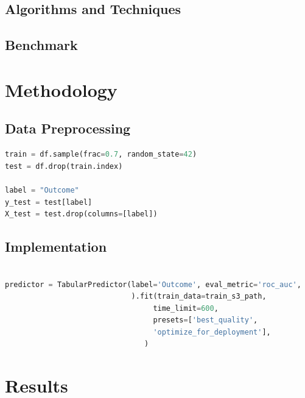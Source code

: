 \documentclass[
]{article}
\begin{document}
\hypertarget{algorithms-and-techniques}{%
\subsection{Algorithms and Techniques}\label{algorithms-and-techniques}}

\hypertarget{benchmark}{%
\subsection{Benchmark}\label{benchmark}}

\hypertarget{methodology}{%
\section{Methodology}\label{methodology}}

\hypertarget{data-preprocessing}{%
\subsection{Data Preprocessing}\label{data-preprocessing}}

\begin{lstlisting}[language=python]
train = df.sample(frac=0.7, random_state=42)
test = df.drop(train.index)

label = "Outcome"
y_test = test[label]
X_test = test.drop(columns=[label])

\end{lstlisting}

\hypertarget{implementation}{%
\subsection{Implementation}\label{implementation}}

\begin{lstlisting}[language=python]
%%time

predictor = TabularPredictor(label='Outcome', eval_metric='roc_auc',
                             ).fit(train_data=train_s3_path,
                                  time_limit=600,
                                  presets=['best_quality',
                                  'optimize_for_deployment'],
                                )
\end{lstlisting}

\hypertarget{results}{%
\section{Results}\label{results}}
\end{document}
